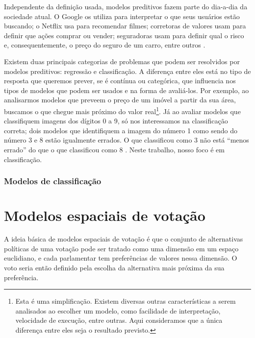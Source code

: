 \documentclass[a4paper,titlepage]{ppgi}\usepackage[]{graphicx}\usepackage[]{color}
\begin{document}
Independente da definição usada, modelos preditivos fazem parte do dia-a-dia da
sociedade atual. O Google os utiliza para interpretar o que seus usuários estão
buscando; o Netflix usa para recomendar filmes; corretoras de valores usam para
definir que ações comprar ou vender; seguradoras usam para definir qual o risco
e, consequentemente, o preço do seguro de um carro, entre outros
\cite{Levy2010}.

Existem duas principais categorias de problemas que podem ser resolvidos por
modelos preditivos: regressão e classificação. A diferença entre eles está no
tipo de resposta que queremos prever, se é contínua ou categórica, que
influencia nos tipos de modelos que podem ser usados e na forma de avaliá-los.
Por exemplo, ao analisarmos modelos que preveem o preço de um imóvel a partir
da sua área, buscamos o que chegue mais próximo do valor real\footnote{Esta é
uma simplificação. Existem diversas outras características a serem analisados
ao escolher um modelo, como facilidade de interpretação, velocidade de
execução, entre outras. Aqui consideramos que a única diferença entre eles seja
o resultado previsto.}. Já ao avaliar modelos que classifiquem imagens dos
dígitos 0 a 9, só nos interessamos na classificação correta; dois modelos que
identifiquem a imagem do número 1 como sendo do número 3 e 8 estão igualmente
errados. O que classificou como 3 não está ``menos errado'' do que o que
classificou como 8 \cite{Kuhn2013,Zumel2014}. Neste trabalho, nosso foco é em
classificação.

\subsubsection{Modelos de classificação}





\section{Modelos espaciais de votação}



A ideia básica de modelos espaciais de votação é que o conjunto de alternativas
políticas de uma votação pode ser tratado como uma dimensão em um espaço
euclidiano, e cada parlamentar tem preferências de valores nessa dimensão. O
voto seria então definido pela escolha da alternativa mais próxima da sua
preferência.
\end{document}

